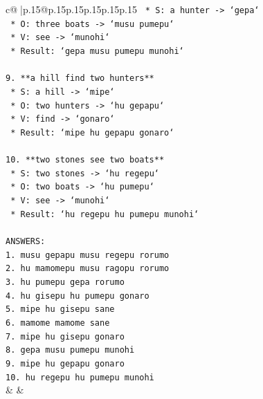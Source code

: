 \documentclass{article}
\begin{document}
{\begin{supertabular}{c@{$\;$}|p{.15\linewidth}@{}p{.15\linewidth}p{.15\linewidth}p{.15\linewidth}p{.15\linewidth}p{.15\linewidth}}
{{{\texttt{    *   S: a hunter {-}> `gepa`} \\
\texttt{    *   O: three boats {-}> `musu pumepu`} \\
\texttt{    *   V: see {-}> `munohi`} \\
\texttt{    *   Result: `gepa musu pumepu munohi`} \\
\\ 
\texttt{9.  **a hill find two hunters**} \\
\texttt{    *   S: a hill {-}> `mipe`} \\
\texttt{    *   O: two hunters {-}> `hu gepapu`} \\
\texttt{    *   V: find {-}> `gonaro`} \\
\texttt{    *   Result: `mipe hu gepapu gonaro`} \\
\\ 
\texttt{10. **two stones see two boats**} \\
\texttt{    *   S: two stones {-}> `hu regepu`} \\
\texttt{    *   O: two boats {-}> `hu pumepu`} \\
\texttt{    *   V: see {-}> `munohi`} \\
\texttt{    *   Result: `hu regepu hu pumepu munohi`} \\
\\ 
\texttt{ANSWERS:} \\
\texttt{1. musu gepapu musu regepu rorumo} \\
\texttt{2. hu mamomepu musu ragopu rorumo} \\
\texttt{3. hu pumepu gepa rorumo} \\
\texttt{4. hu gisepu hu pumepu gonaro} \\
\texttt{5. mipe hu gisepu sane} \\
\texttt{6. mamome mamome sane} \\
\texttt{7. mipe hu gisepu gonaro} \\
\texttt{8. gepa musu pumepu munohi} \\
\texttt{9. mipe hu gepapu gonaro} \\
\texttt{10. hu regepu hu pumepu munohi} \\
            }
        }
    }
    & & \\ \\


\end{supertabular}}
\end{document}

